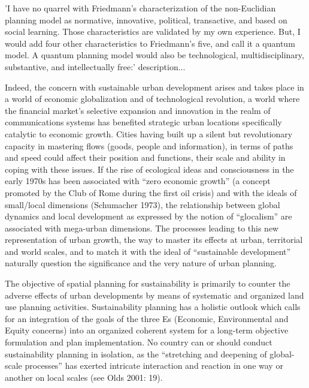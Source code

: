 \parencite{Casella2007}
'I have no quarrel with Friedmann’s characterization
of the non-Euclidian planning model as normative, innovative, political, transactive, and based on social learning. Those characteristics are validated by my own experience. But, I would add four other characteristics to Friedmann’s five, and call it a quantum model. A quantum planning model would also be technological, multidisciplinary, substantive, and intellectually free:'
description...



\parencite{WongTai-Chee;YuenBelinda;Goldblum2008}


Indeed, the concern with sustainable urban development arises and takes place in a world of economic globalization and of technological revolution, a world where the financial market’s selective expansion and innovation in the realm of communications systems has benefited strategic urban locations specifically catalytic to economic growth. Cities having built up a silent but revolutionary capacity in mastering flows (goods, people and information), in terms of paths and speed could affect their position and functions, their scale and ability in coping with these issues. If the rise of ecological ideas and consciousness in the early 1970s has been associated with “zero economic growth” (a concept promoted by the Club of Rome during the first oil crisis) and with the ideals of small/local dimensions (Schumacher 1973), the relationship between global dynamics and local development as expressed by the notion of “glocalism” are associated with mega-urban dimensions. The processes leading to this new representation of urban growth, the way to master its effects at urban, territorial and world scales, and to match it with the ideal of “sustainable development” naturally question the significance and the very nature of urban planning.\par

The objective of spatial planning for sustainability is primarily to counter the adverse effects of urban developments by means of systematic and organized land use planning activities. Sustainability planning has a holistic outlook which calls for an integration of the goals of the three Es (Economic, Environmental and Equity concerns) into an organized coherent system for a long-term objective formulation and plan implementation. No country can or should conduct sustainability planning in isolation, as the “stretching and deepening of global-scale processes” has exerted intricate interaction and reaction in one way or another on local scales (see Olds 2001: 19).\par



